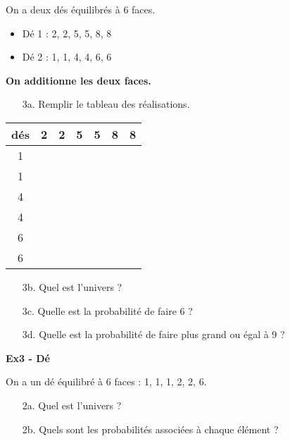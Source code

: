 \begin{multicols}{2}\noindent
On a deux dés équilibrés à 6 faces. 

\begin{itemize}[label={$\bullet$}]
  \item Dé 1 : 2, 2, 5, 5, 8, 8
  \item Dé 2 : 1, 1, 4, 4, 6, 6 
\end{itemize} 

\textbf{On additionne les deux faces.} 
\begin{enumerate}
  \item[3a.] Remplir le tableau des réalisations.
\end{enumerate}  
\columnbreak 

\begin{center}\begin{tabular}{|c|c|c|c|c|c|c|} \hline
  dés & 2 & 2 & 5 & 5 & 8 & 8 \\  \hline
    1 &   &   &   &   &   &   \\  \hline
    1 &   &   &   &   &   &   \\  \hline
    4 &   &   &   &   &   &   \\  \hline
    4 &   &   &   &   &   &   \\  \hline
    6 &   &   &   &   &   &   \\  \hline
    6 &   &   &   &   &   &   \\  \hline
\end{tabular}\end{center}

\end{multicols}

\begin{enumerate}
  \item[3b.] Quel est l'univers ? \\ \Pointilles[2] 
  \item[3c.] Quelle est la probabilité de faire 6 ? \\ \Pointilles[2] 
  \item[3d.] Quelle est la probabilité de faire plus grand ou égal à 9 ? \\ \Pointilles[3]  
\end{enumerate}  

\textbf{Ex3 - Dé}

On a un dé équilibré à 6 faces : 1, 1, 1, 2, 2, 6.

\begin{enumerate}
  \item[2a.] Quel est l'univers ? \\ \Pointilles[2]
  \item[2b.] Quels sont les probabilités associées à chaque élément ? \\ \Pointilles[3]
\end{enumerate}  

